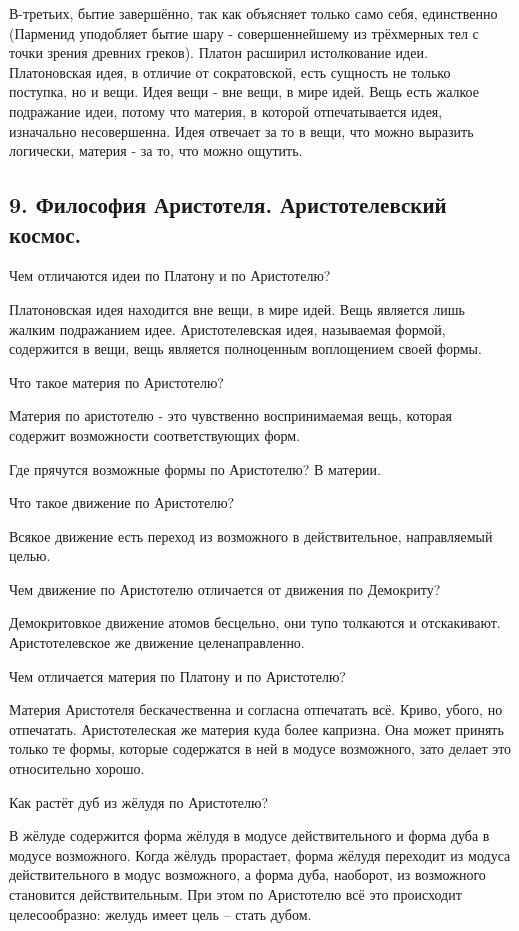 \documentclass[a4paper, 12pt]{article}
\begin{document}
В-третьих, бытие завершённо, так как объясняет только само себя, единственно (Парменид уподобляет бытие шару - совершеннейшему из трёхмерных тел с точки зрения древних греков).
Платон расширил истолкование идеи.
Платоновская идея, в отличие от сократовской, есть сущность не только поступка, но и вещи.
Идея вещи - вне вещи, в мире идей.
Вещь есть жалкое подражание идеи, потому что материя, в которой отпечатывается идея, изначально несовершенна.
Идея отвечает за то в вещи, что можно выразить логически, материя - за то, что можно ощутить.


\subsection*{\textbf{9. Философия Аристотеля. Аристотелевский космос.}}
Чем отличаются идеи по Платону и по Аристотелю?

Платоновская идея находится вне вещи, в мире идей. Вещь является лишь жалким подражанием идее.
Аристотелевская идея, называемая формой, содержится в вещи, вещь является полноценным воплощением своей формы.

Что такое материя по Аристотелю?

Материя по аристотелю - это чувственно воспринимаемая вещь, которая содержит возможности соответствующих форм.

Где прячутся возможные формы по Аристотелю?
В материи.

Что такое движение по Аристотелю?

Всякое движение есть переход из возможного в действительное, направляемый целью.

Чем движение по Аристотелю отличается от движения по Демокриту?

Демокритовкое движение атомов бесцельно, они тупо толкаются и отскакивают. Аристотелевское же движение целенаправленно.

Чем отличается материя по Платону и по Аристотелю?

Материя Аристотеля бескачественна и согласна отпечатать всё. Криво, убого, но отпечатать. Аристотелеская же материя куда более капризна. Она может принять только те формы, которые содержатся в ней в модусе возможного, зато делает это относительно хорошо.

Как растёт дуб из жёлудя по Аристотелю?

В жёлуде содержится форма жёлудя в модусе действительного и форма дуба в модусе возможного. Когда жёлудь прорастает, форма жёлудя переходит из модуса действительного в модус возможного, а форма дуба, наоборот, из возможного становится действительным. При этом по Аристотелю всё это происходит целесообразно: желудь имеет цель – стать дубом.
\end{document}
